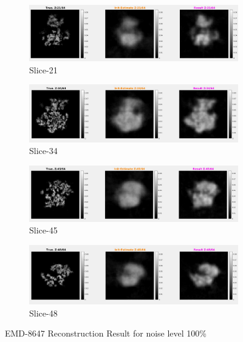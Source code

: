 \documentclass{report}
\begin{document}
\begin{figure}[H]
\centering

\begin{subfigure}{1\textwidth}
\centering
\includegraphics[width=1\linewidth]{emd_8647_result_1.png}
\captionsetup{justification=centering}
\caption{ Slice-21 }
\end{subfigure} 

\begin{subfigure}{1\textwidth}
\centering
\includegraphics[width=1\linewidth]{emd_8647_result_2.png}
\captionsetup{justification=centering}
\caption{ Slice-34 }
\end{subfigure} 

\begin{subfigure}{1\textwidth}
\centering
\includegraphics[width=1\linewidth]{emd_8647_result_3.png}
\captionsetup{justification=centering}
\caption{ Slice-45 }
\end{subfigure} 

\begin{subfigure}{1\textwidth}
\centering
\includegraphics[width=1\linewidth]{emd_8647_result_4.png}
\captionsetup{justification=centering}
\caption{ Slice-48 }
\end{subfigure} 


\caption{EMD-8647 Reconstruction Result for noise level 100\%}
\label{fig:EMD-8647 Reconstruction: Result-noise 100}
\end{figure}
\end{document}
